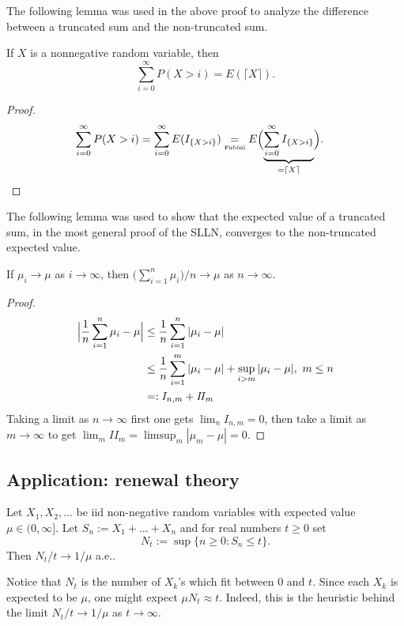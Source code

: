The following lemma was used in the above proof to analyze the difference between a truncated sum and the non-truncated sum.

\begin{lemma}
\label{lemma: expect ceiling}
If $X$ is a nonnegative random variable, then
\begin{equation}
\label{rtyu}
 \sum_{i=0}^\infty P(X>i) = E( \lceil X\rceil).
 \end{equation}
\end{lemma}
\begin{proof}
\begin{align*}
\sum_{i=0}^\infty P(X>i)
& = \sum_{i=0}^\infty E(I_{\{X>i\}})  \underset{\text{\tiny Fubini}} =  E\Bigl(\underbrace{\sum_{i=0}^\infty I_{\{X>i\}}}_{=\lceil X\rceil}\Bigr).
\end{align*}
\end{proof}



The following lemma was used to show that the expected value of a truncated sum, in the most general proof of the SLLN, converges to the non-truncated expected value.
\begin{lemma}
\label{lemma: cesar summation}
If $\mu_i\rightarrow \mu$ as $i\rightarrow \infty$, then $\bigl(\sum_{i=1}^n \mu_i\bigr)/n\rightarrow \mu$ as $n\rightarrow \infty$.
\end{lemma}
\begin{proof}
\begin{align*}
\Bigl|\frac{1}{n}\sum_{i=1}^n \mu_i-  \mu\Bigr|
& \leq \frac{1}{n}\sum_{i=1}^n |\mu_i - \mu|\\
& \leq \frac{1}{n}\sum_{i=1}^m |\mu_i - \mu| + \sup_{i > m} |\mu_i - \mu|,\,\, m\leq n\\
& =: I_{n,m} + I\!I_{m}
\end{align*}
Taking a limit as $n\rightarrow \infty$ first one gets $\lim_{n} I_{n,m} = 0$, then take a limit as $m\rightarrow \infty$ to get $\lim_{m} I\!I_{m} = \limsup_{m} |\mu_m - \mu| = 0$.
\end{proof}



\subsection{Application: renewal theory}

\begin{theorem}
Let $X_1, X_2, \ldots$ be iid non-negative random variables with expected value $\mu\in(0,\infty]$. Let $S_n:= X_1+\ldots+X_n$ and for real numbers $t\geq 0$ set
\[N_t:=\sup\{ n\geq 0\colon S_n\leq t \}.  \]
Then $N_t/t \rightarrow 1/\mu$ a.e..
\end{theorem}
Notice that $N_t$ is the number of $X_k$'s which fit between $0$ and $t$. Since each $X_k$ is expected to be $\mu$, one might expect $\mu N_t\approx t$. Indeed, this is the heuristic behind the limit $N_t/t \rightarrow 1/\mu$ as $t\rightarrow \infty$.

